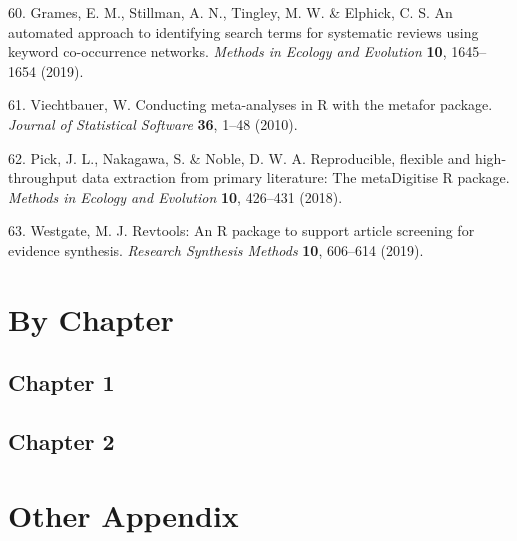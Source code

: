 \documentclass[a4paper, twoside]{templates/ociamthesis}
\newcommand*{\bibtitle}{Bibliography}
\begin{document}
\leavevmode\hypertarget{ref-grames2019automated}{}%
60. Grames, E. M., Stillman, A. N., Tingley, M. W. \& Elphick, C. S. An automated approach to identifying search terms for systematic reviews using keyword co-occurrence networks. \emph{Methods in Ecology and Evolution} \textbf{10}, 1645--1654 (2019).

\leavevmode\hypertarget{ref-metaforref}{}%
61. Viechtbauer, W. Conducting meta-analyses in R with the metafor package. \emph{Journal of Statistical Software} \textbf{36}, 1--48 (2010).

\leavevmode\hypertarget{ref-pick2018}{}%
62. Pick, J. L., Nakagawa, S. \& Noble, D. W. A. Reproducible, flexible and high-throughput data extraction from primary literature: The metaDigitise R package. \emph{Methods in Ecology and Evolution} \textbf{10}, 426--431 (2018).

\leavevmode\hypertarget{ref-westgate2019revtools}{}%
63. Westgate, M. J. Revtools: An R package to support article screening for evidence synthesis. \emph{Research Synthesis Methods} \textbf{10}, 606--614 (2019).

\startappendices

\hypertarget{by-chapter}{%
\chapter{By Chapter}\label{by-chapter}}

\hypertarget{chapter-1}{%
\section{Chapter 1}\label{chapter-1}}

\hypertarget{chapter-2}{%
\section{Chapter 2}\label{chapter-2}}

\hypertarget{other-appendix}{%
\chapter{Other Appendix}\label{other-appendix}}




\setlength{\baselineskip}{0pt} %

{\renewcommand*\MakeUppercase[1]{#1}%
\printbibliography[heading=bibintoc,title={\bibtitle}]}
\end{document}
